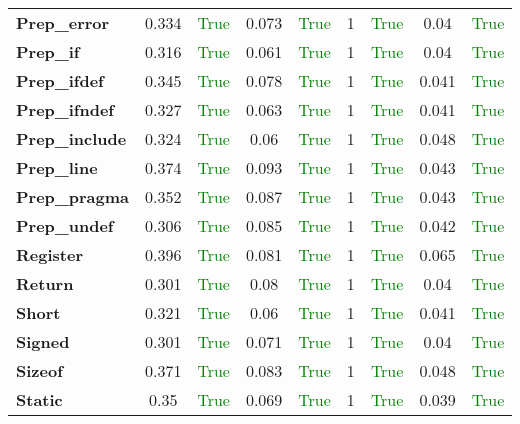 \documentclass{article}
\begin{document}
\begin{xltabular}{\textwidth}{lcccccccc}
\textbf{Prep\_error}& 0.334&\textcolor{green}{True}& 0.073&\textcolor{green}{True}& 1&\textcolor{green}{True}& 0.04&\textcolor{green}{True} \\[0.5ex]
\textbf{Prep\_if}& 0.316&\textcolor{green}{True}& 0.061&\textcolor{green}{True}& 1&\textcolor{green}{True}& 0.04&\textcolor{green}{True} \\[0.5ex]
\textbf{Prep\_ifdef}& 0.345&\textcolor{green}{True}& 0.078&\textcolor{green}{True}& 1&\textcolor{green}{True}& 0.041&\textcolor{green}{True} \\[0.5ex]
\textbf{Prep\_ifndef}& 0.327&\textcolor{green}{True}& 0.063&\textcolor{green}{True}& 1&\textcolor{green}{True}& 0.041&\textcolor{green}{True} \\[0.5ex]
\textbf{Prep\_include}& 0.324&\textcolor{green}{True}& 0.06&\textcolor{green}{True}& 1&\textcolor{green}{True}& 0.048&\textcolor{green}{True} \\[0.5ex]
\textbf{Prep\_line}& 0.374&\textcolor{green}{True}& 0.093&\textcolor{green}{True}& 1&\textcolor{green}{True}& 0.043&\textcolor{green}{True} \\[0.5ex]
\textbf{Prep\_pragma}& 0.352&\textcolor{green}{True}& 0.087&\textcolor{green}{True}& 1&\textcolor{green}{True}& 0.043&\textcolor{green}{True} \\[0.5ex]
\textbf{Prep\_undef}& 0.306&\textcolor{green}{True}& 0.085&\textcolor{green}{True}& 1&\textcolor{green}{True}& 0.042&\textcolor{green}{True} \\[0.5ex]
\textbf{Register}& 0.396&\textcolor{green}{True}& 0.081&\textcolor{green}{True}& 1&\textcolor{green}{True}& 0.065&\textcolor{green}{True} \\[0.5ex]
\textbf{Return}& 0.301&\textcolor{green}{True}& 0.08&\textcolor{green}{True}& 1&\textcolor{green}{True}& 0.04&\textcolor{green}{True} \\[0.5ex]
\textbf{Short}& 0.321&\textcolor{green}{True}& 0.06&\textcolor{green}{True}& 1&\textcolor{green}{True}& 0.041&\textcolor{green}{True} \\[0.5ex]
\textbf{Signed}& 0.301&\textcolor{green}{True}& 0.071&\textcolor{green}{True}& 1&\textcolor{green}{True}& 0.04&\textcolor{green}{True} \\[0.5ex]
\textbf{Sizeof}& 0.371&\textcolor{green}{True}& 0.083&\textcolor{green}{True}& 1&\textcolor{green}{True}& 0.048&\textcolor{green}{True} \\[0.5ex]
\textbf{Static}& 0.35&\textcolor{green}{True}& 0.069&\textcolor{green}{True}& 1&\textcolor{green}{True}& 0.039&\textcolor{green}{True} \\[0.5ex]

\end{xltabular}
\end{document}
